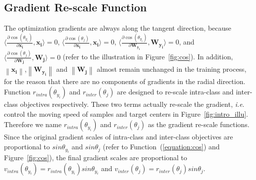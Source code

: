 \documentclass[journal,comsoc]{IEEEtran}
\begin{document}
\subsection{Gradient Re-scale Function}
The optimization gradients are always along the tangent direction, because $\!\langle\frac{{\partial \cos \left( {{\theta _{{y_i}}}} \right)}}{{\partial \bm{x_i}}},\bm{x_i}\rangle\!=\!0$, $ \langle\frac{{\partial \cos \left( {{\theta _{{j}}}} \right)}}{{\partial \bm{x_i}}},\bm{x_i}\rangle\!=\!0$, $\langle\frac{{\partial \cos \left( {{\theta _{{y_i}}}} \right)}}{{\partial \bm{W_{{y_i}}}}},\bm{W_{{y_i}}}\rangle\!=\!0$, and $\langle{\frac{{\partial \cos \left( {{\theta _j}} \right)}}{{\partial \bm{W_j}}},\bm{W_j}}\rangle\!=\! 0$ (refer to the illustration in Figure~\ref{fig:cos}). In addition, ${\left\| {\bm{x_i}} \right\|}$,${\left\| {\bm{W_{{y_i}}}} \right\|}$ and ${\left\| {\bm{W_{{j}}}} \right\|}$ almost remain unchanged in the training process, for the reason that there are no components of gradients in the radial direction. Function ${r_{intra}}\left( {{\theta _{{y_i}}}}\right)$ and ${r_{inter}}\left( {{\theta _j}} \right)$ are designed to re-scale intra-class and inter-class objectives respectively. These two terms actually re-scale the gradient, \emph{i.e}. control the moving speed of samples and target centers in Figure~\ref{fig:intro_illu}. Therefore we name ${r_{intra}}\left( {{\theta _{{y_i}}}}\right)$ and ${r_{inter}}\left( {{\theta _j}} \right)$ as the gradient re-scale functions. Since the original gradient scales of intra-class and inter-class objectives are proportional to $sin\theta_{y_i}$ and $sin\theta_j$ (refer to Function~(\ref{equation:cos}) and Figure~\ref{fig:cos}), the final gradient scales are proportional to ${v_{intra}}\left( {{\theta _{{y_i}}}} \right)={r_{intra}}\left( {{\theta _{{y_i}}}} \right)sin\theta_{y_i}$ and ${v_{inter}}\left( {{\theta _j}} \right)={r_{inter}}\left( {{\theta _j}} \right)sin\theta_j$.
\end{document}
